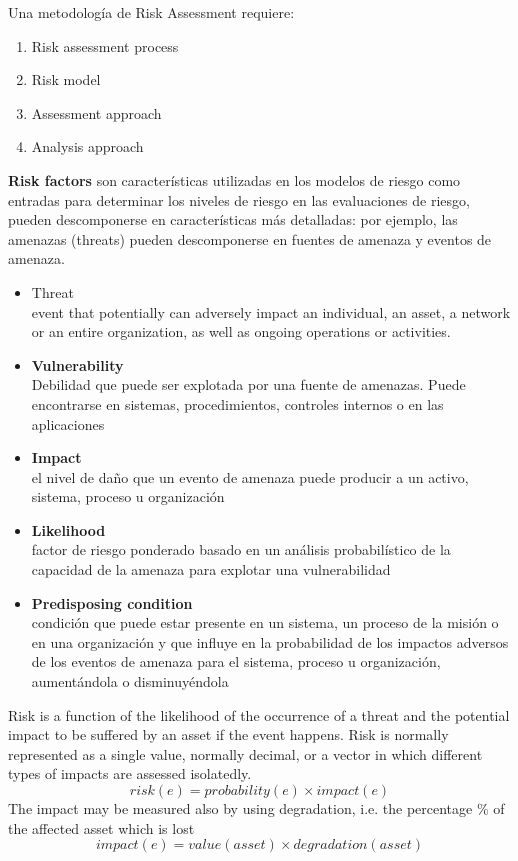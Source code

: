 Una metodología de Risk Assessment requiere:
\begin{enumerate}
   \item Risk assessment process
   \item Risk model
   \item Assessment approach
   \item Analysis approach
\end{enumerate}

{\textbf{Risk factors} son características utilizadas en los modelos de riesgo como entradas para determinar los niveles de riesgo en las evaluaciones de riesgo, pueden descomponerse en características más detalladas: por ejemplo, las amenazas (threats) pueden descomponerse en fuentes de amenaza y eventos de amenaza.\ns
\begin{itemize}
   \begin{itemize}
   	\item Threat\\
   	event that potentially can adversely impact an individual, an
asset, a network or an entire organization, as well as ongoing operations or
activities.
	   \item \textbf{Vulnerability}\\
	   Debilidad que puede ser explotada por una fuente de amenazas. Puede encontrarse en sistemas, procedimientos, controles internos o en las aplicaciones
	   \item \textbf{Impact}\\
	   el nivel de daño que un evento de amenaza puede producir a un activo, sistema, proceso u organización
	   \item \textbf{Likelihood}\\
      factor de riesgo ponderado basado en un análisis probabilístico de la capacidad de la amenaza para explotar una vulnerabilidad
	   \item \textbf{Predisposing condition}\\
	   condición que puede estar presente en un sistema, un proceso de la misión o en una organización y que influye en la probabilidad de los impactos adversos de los eventos de amenaza para el sistema, proceso u organización, aumentándola o disminuyéndola
   \end{itemize}
\end{itemize}
}

Risk is a function of the likelihood of the occurrence of a
threat and the potential impact to be suffered by an asset if
the event happens.
Risk is normally represented as a single value, normally
decimal, or a vector in which different types of impacts are
assessed isolatedly.
\[
risk(e) = probability(e) \times impact(e)
\]
The impact may be measured also by using degradation, i.e. the percentage \% of the affected asset which is lost 
\[
   impact(e) = value(asset) \times degradation(asset)
\]
